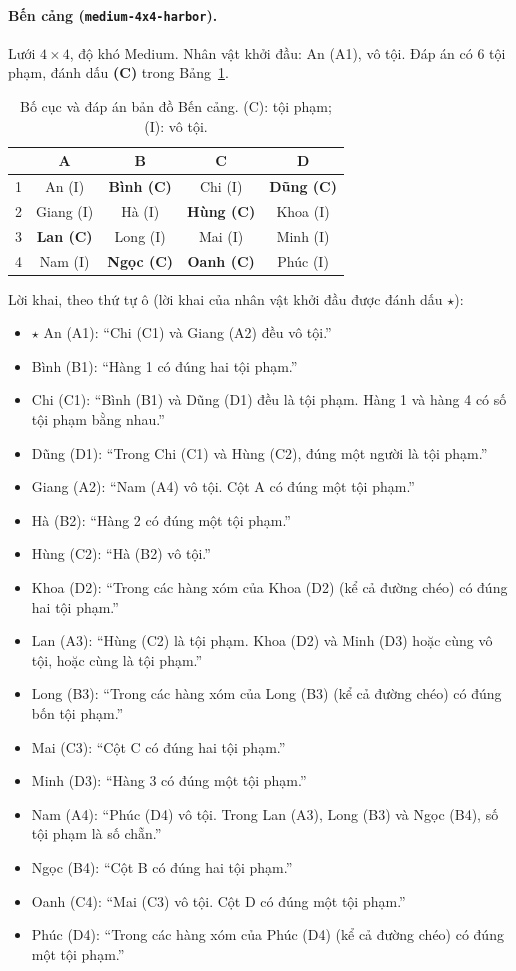 \paragraph{Bến cảng (\texttt{medium-4x4-harbor}).}
Lưới $4\times4$, độ khó Medium. Nhân vật khởi đầu: An (A1), vô tội. Đáp án có 6 tội phạm, đánh dấu \textbf{(C)} trong Bảng~\ref{tab:map_harbor}.
\begin{table}[htbp]
  \centering\small
  \caption{Bố cục và đáp án bản đồ Bến cảng. (C): tội phạm; (I): vô tội.}
  \label{tab:map_harbor}
  \begin{tabular}{ccccc}
    \toprule
    & A & B & C & D \\
    \midrule
    1 & An (I) & \textbf{Bình (C)} & Chi (I) & \textbf{Dũng (C)} \\
    2 & Giang (I) & Hà (I) & \textbf{Hùng (C)} & Khoa (I) \\
    3 & \textbf{Lan (C)} & Long (I) & Mai (I) & Minh (I) \\
    4 & Nam (I) & \textbf{Ngọc (C)} & \textbf{Oanh (C)} & Phúc (I) \\
    \bottomrule
  \end{tabular}
\end{table}
\noindent Lời khai, theo thứ tự ô (lời khai của nhân vật khởi đầu được đánh dấu $\star$):
\begin{itemize}\setlength{\itemsep}{0pt}\small
  \item $\star$ An (A1): ``Chi (C1) và Giang (A2) đều vô tội.''
  \item Bình (B1): ``Hàng 1 có đúng hai tội phạm.''
  \item Chi (C1): ``Bình (B1) và Dũng (D1) đều là tội phạm. Hàng 1 và hàng 4 có số tội phạm bằng nhau.''
  \item Dũng (D1): ``Trong Chi (C1) và Hùng (C2), đúng một người là tội phạm.''
  \item Giang (A2): ``Nam (A4) vô tội. Cột A có đúng một tội phạm.''
  \item Hà (B2): ``Hàng 2 có đúng một tội phạm.''
  \item Hùng (C2): ``Hà (B2) vô tội.''
  \item Khoa (D2): ``Trong các hàng xóm của Khoa (D2) (kể cả đường chéo) có đúng hai tội phạm.''
  \item Lan (A3): ``Hùng (C2) là tội phạm. Khoa (D2) và Minh (D3) hoặc cùng vô tội, hoặc cùng là tội phạm.''
  \item Long (B3): ``Trong các hàng xóm của Long (B3) (kể cả đường chéo) có đúng bốn tội phạm.''
  \item Mai (C3): ``Cột C có đúng hai tội phạm.''
  \item Minh (D3): ``Hàng 3 có đúng một tội phạm.''
  \item Nam (A4): ``Phúc (D4) vô tội. Trong Lan (A3), Long (B3) và Ngọc (B4), số tội phạm là số chẵn.''
  \item Ngọc (B4): ``Cột B có đúng hai tội phạm.''
  \item Oanh (C4): ``Mai (C3) vô tội. Cột D có đúng một tội phạm.''
  \item Phúc (D4): ``Trong các hàng xóm của Phúc (D4) (kể cả đường chéo) có đúng một tội phạm.''
\end{itemize}

